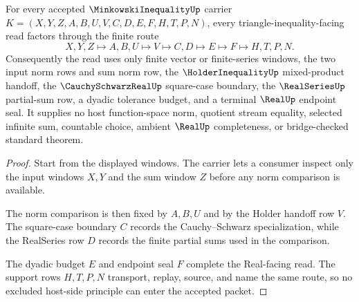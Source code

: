 \begin{theorem}\label{thm:minkowski-inequality-holder-handoff}
For every accepted $\MinkowskiInequalityUp$ carrier $K=(X,Y,Z,A,B,U,V,C,D,E,F,H,T,P,N)$, every triangle-inequality-facing read factors through the finite route
$$
X,Y,Z \longmapsto A,B,U \longmapsto V \longmapsto C,D \longmapsto E \longmapsto F \longmapsto H,T,P,N .
$$
Consequently the read uses only finite vector or finite-series windows, the two input norm rows and sum norm row, the $\HolderInequalityUp$ mixed-product handoff, the $\CauchySchwarzRealUp$ square-case boundary, the $\RealSeriesUp$ partial-sum row, a dyadic tolerance budget, and a terminal $\RealUp$ endpoint seal. It supplies no host function-space norm, quotient stream equality, selected infinite sum, countable choice, ambient $\RealUp$ completeness, or bridge-checked standard theorem.
\end{theorem}
\begin{proof}
Start from the displayed windows. The carrier lets a consumer inspect only the input windows $X,Y$ and the sum window $Z$ before any norm comparison is available.

The norm comparison is then fixed by $A,B,U$ and by the Holder handoff row $V$. The square-case boundary $C$ records the Cauchy--Schwarz specialization, while the RealSeries row $D$ records the finite partial sums used in the comparison.

The dyadic budget $E$ and endpoint seal $F$ complete the Real-facing read. The support rows $H,T,P,N$ transport, replay, source, and name the same route, so no excluded host-side principle can enter the accepted packet.
\end{proof}



